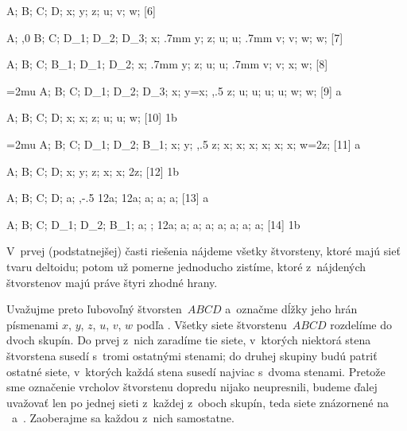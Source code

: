 {%
\fontplace
\tpoint A; \tpoint B; \lpoint C; \bpoint D;
\ltpoint{} x; \bpoint y; \tpoint z;
\rpoint u; \lpoint v; \lBpoint w;
[6] \hfil\Obr

\fontplace
\rpoint A; \tpoint{},0 B; \bpoint C;
\lpoint D_1; \rpoint D_2; \tpoint D_3;
\rpoint x; \tpoint\toright.7mm y; \bpoint z;
\rpoint u; \rpoint u; \ltpoint\toleft.7mm v; \tpoint v;
\lBpoint w; \bpoint w;
[7] \hfil\Obr

\fontplace
\rpoint A; \lpoint B; \lBpoint C;
\bpoint B_1; \tpoint D_1; \rpoint D_2;
\rpoint x; \tpoint\toright.7mm y; \bpoint z;
\rpoint u; \rpoint u; \ltpoint\toleft.7mm v; \bpoint v;
\lBpoint x; \tpoint w;
[8] \hfil\Obr

\fontplace
\thickmuskip=2mu
\rBpoint A; \tpoint B; \lBpoint C;
\lpoint D_1; \bpoint D_2; \rpoint D_3;
\tpoint x; \bpoint y=x; \bpoint{},.5 z;
\rpoint u; \rpoint u; \tpoint u; \tpoint u;
\lpoint w; \lBpoint w;
[9] \hfil\Obr a

\fontplace
\rBpoint A; \tpoint B; \lpoint C; \bpoint D;
\tpoint x; \tpoint x; \tpoint z;
\rBpoint u; \rBpoint u; \bpoint w;
[10] \hfil\Obrr1b

\fontplace
\thickmuskip=2mu
\rBpoint A; \tpoint B; \lpoint C;
\rpoint D_1; \bpoint D_2; \lpoint B_1;
\tpoint x; \tpoint y; \bpoint{},.5 z;
\rpoint x; \rpoint x; \lBpoint x; \lpoint x;
\tpoint x; \tpoint x;
\lpoint w=2z;
[11] \hfil\Obr a

\fontplace
\rpoint A; \tpoint B; \lpoint C; \bpoint D;
\tpoint x; \bpoint y; \tpoint z;
\rBpoint x; \rBpoint x; \lBpoint 2z;
[12] \hfil\Obrr1b

\fontplace
\rpoint A; \tpoint B; \lpoint C; \bpoint D;
\tpoint a; \bpoint{},-.5 \frac12a;
\tpoint \frac12a;
\rBpoint a; \rBpoint a; \lBpoint a;
[13] \hfil\Obr a

\fontplace
\bpoint A; \tpoint B; \tpoint C;
\rpoint D_1; \bpoint D_2; \lpoint B_1;
\tpoint a; \tpoint ; \rpoint \frac12a;
\bpoint a; \bpoint a; \bpoint a; \tpoint a;
\tpoint a; \tpoint a;
\rpoint a;
[14] \hfil\Obrr1b

V~prvej (podstatnejšej) časti riešenia nájdeme všetky štvorsteny,
ktoré majú sieť tvaru deltoidu; potom už pomerne jednoducho zistíme,
ktoré z~nájdených štvorstenov majú práve štyri zhodné hrany.

\inspicture
Uvažujme preto ľubovoľný štvorsten~$ABCD$ a~označme dĺžky jeho
hrán písmenami $x$, $y$, $z$, $u$, $v$, $w$ podľa \obr. Všetky
siete štvorstenu~$ABCD$ rozdelíme do dvoch skupín. Do prvej z~nich
zaradíme tie siete, v~ktorých niektorá stena štvorstena susedí s~tromi
ostatnými stenami; do druhej skupiny budú patriť ostatné siete,
v~ktorých každá stena susedí najviac s~dvoma stenami. Pretože sme
označenie vrcholov štvorstenu dopredu nijako neupresnili, budeme ďalej
uvažovať len po jednej sieti z~každej z~oboch skupín, teda siete
znázornené na \obr~a~\obrnum. Zaoberajme sa každou z~nich
samostatne.

}
